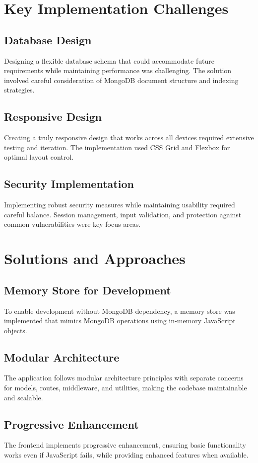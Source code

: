 \documentclass[12pt,a4paper]{report}
\begin{document}
\section{Key Implementation Challenges}
\subsection{Database Design}
Designing a flexible database schema that could accommodate future requirements while maintaining performance was challenging. The solution involved careful consideration of MongoDB document structure and indexing strategies.

\subsection{Responsive Design}
Creating a truly responsive design that works across all devices required extensive testing and iteration. The implementation used CSS Grid and Flexbox for optimal layout control.

\subsection{Security Implementation}
Implementing robust security measures while maintaining usability required careful balance. Session management, input validation, and protection against common vulnerabilities were key focus areas.

\section{Solutions and Approaches}
\subsection{Memory Store for Development}
To enable development without MongoDB dependency, a memory store was implemented that mimics MongoDB operations using in-memory JavaScript objects.

\subsection{Modular Architecture}
The application follows modular architecture principles with separate concerns for models, routes, middleware, and utilities, making the codebase maintainable and scalable.

\subsection{Progressive Enhancement}
The frontend implements progressive enhancement, ensuring basic functionality works even if JavaScript fails, while providing enhanced features when available.
\end{document}
